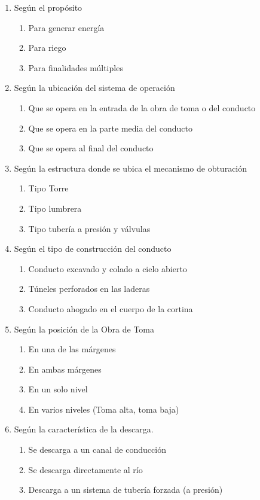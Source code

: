 \begin{enumerate}[noitemsep]
	\item Según el propósito
	      \begin{enumerate}
		      \item Para generar energía
		      \item Para riego
		      \item Para finalidades múltiples
	      \end{enumerate}
	\item Según la ubicación del sistema de operación
	      \begin{enumerate}
		      \item Que se opera en la entrada de la obra de toma o del conducto
		      \item Que se opera en la parte media del conducto
		      \item Que se opera al final del conducto
	      \end{enumerate}
	\item Según la estructura donde se ubica el mecanismo de obturación
	      \begin{enumerate}
		      \item Tipo Torre
		      \item Tipo lumbrera
		      \item Tipo tubería a presión y válvulas
	      \end{enumerate}
	\item Según el tipo de construcción del conducto
	      \begin{enumerate}
		      \item Conducto excavado y colado a cielo abierto
		      \item Túneles perforados en las laderas
		      \item Conducto ahogado en el cuerpo de la cortina
	      \end{enumerate}
	\item Según la posición de la Obra de Toma
	      \begin{enumerate}
		      \item En una de las márgenes
		      \item En ambas márgenes
		      \item En un solo nivel
		      \item En varios niveles (Toma alta, toma baja)
	      \end{enumerate}
	\item Según la característica de la descarga.
	      \begin{enumerate}
		      \item Se descarga a un canal de conducción
		      \item Se descarga directamente al río
		      \item Descarga a un sistema de tubería forzada (a presión)
	      \end{enumerate}
\end{enumerate}

